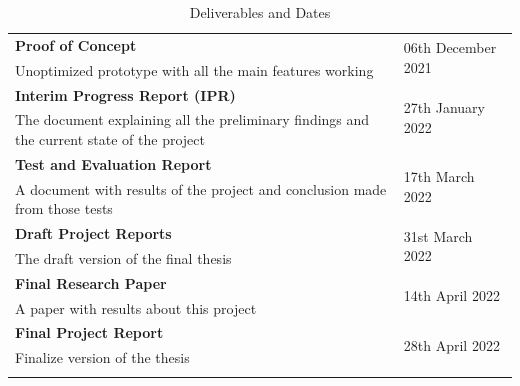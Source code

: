 \begin{longtable}{|p{115mm}|p{35mm}|}
\textbf{Proof of Concept} & \multirow{2}{*}{06th December 2021} \\
Unoptimized prototype with all the main features working &  \\ \hline
\textbf{Interim Progress Report (IPR)} & \multirow{2}{*}{27th January 2022} \\
The document explaining all the preliminary findings and the current state of the project &  \\ \hline
\textbf{Test and Evaluation Report} & \multirow{2}{*}{17th March 2022} \\
A document with results of the project and conclusion made from those tests &  \\ \hline
\textbf{Draft Project Reports} & \multirow{2}{*}{31st March 2022} \\
The draft version of the final thesis &  \\ \hline
\textbf{Final Research Paper} & \multirow{2}{*}{14th April 2022} \\
A paper with results about this project &  \\ \hline
\textbf{Final Project Report} & \multirow{2}{*}{28th April 2022} \\
Finalize version of the thesis &  \\ \hline
\caption{Deliverables and Dates}
\end{longtable}


\newpage
